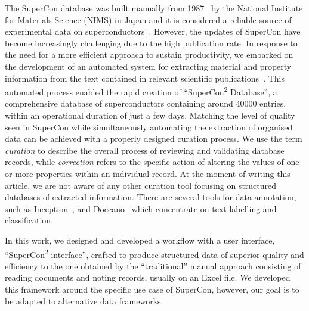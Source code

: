 \documentclass[]{interact}
\theoremstyle{plain} %
\theoremstyle{definition}
\theoremstyle{remark}
\begin{document}

The SuperCon database was built manually from 1987~\cite{ishii2023structuring} by the National Institute for Materials Science (NIMS) in Japan and it is considered a reliable source of experimental data on superconductors~\cite{roter2020predicting, stanev_machine_2017, tran2022machine, konno2021deep}. 
However, the updates of SuperCon have become increasingly challenging due to the high publication rate. 
In response to the need for a more efficient approach to sustain productivity, we embarked on the development of an automated system for extracting material and property information from the text contained in relevant scientific publications~\cite{lfoppiano2023automatic}. 
This automated process enabled the rapid creation of ``SuperCon\textsuperscript{2} Database'', a comprehensive database of superconductors containing around 40000 entries, within an operational duration of just a few days. 
Matching the level of quality seen in SuperCon while simultaneously automating the extraction of organised data can be achieved with a properly designed curation process. 
We use the term \emph{curation} to describe the overall process of reviewing and validating database records, while \emph{correction} refers to the specific action of altering the values of one or more properties within an individual record.
At the moment of writing this article, we are not aware of any other curation tool focusing on structured databases of extracted information. 
There are several tools for data annotation, such as Inception~\cite{klie-etal-2018-inception}, and Doccano~\cite{doccano} which concentrate on text labelling and classification.

In this work, we designed and developed a workflow with a user interface, ``SuperCon\textsuperscript{2} interface'', crafted to produce structured data of superior quality and efficiency to the one obtained by the ``traditional'' manual approach consisting of reading documents and noting records, usually on an Excel file.
We developed this framework around the specific use case of SuperCon, however, our goal is to be adapted to alternative data frameworks.
\end{document}

